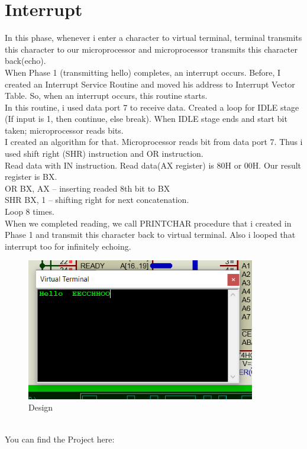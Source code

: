 \documentclass[11pt]{article}
\begin{document}
\section{Interrupt}
In this phase, whenever i enter a character to virtual terminal, terminal transmits this character to our microprocessor and microprocessor transmits this character back(echo).
\\When Phase 1 (transmitting hello) completes, an interrupt occurs. Before, I created an Interrupt Service Routine and moved his address to Interrupt Vector Table. So, when an interrupt occurs, this routine starts.
\\In this routine, i used data port 7 to receive data. Created a loop for IDLE stage (If input is 1, then continue, else break). When IDLE stage ends and start bit taken; microprocessor reads bits. 
\\I created an algorithm for that. Microprocessor reads bit from data port 7. Thus i used shift right (SHR) instruction and OR instruction.
\\Read data with IN instruction. Read data(AX register) is 80H or 00H. Our result register is BX.
\\ OR BX, AX -- inserting readed 8th bit to BX
\\ SHR BX, 1 -- shifting right for next concatenation.
\\ Loop 8 times.
\\ When we completed reading, we call PRINTCHAR procedure that i created in Phase 1 and transmit this character back to virtual terminal. Also i looped that interrupt too for infinitely echoing.
\begin{figure}[h!]
	\centering
	\includegraphics[width=10cm]{Terminal2.png}
	\caption{Design}
	\label{fig:Terminal echo with Interrupt}
\end{figure}
\\You can find the Project here: 
\end{document}
